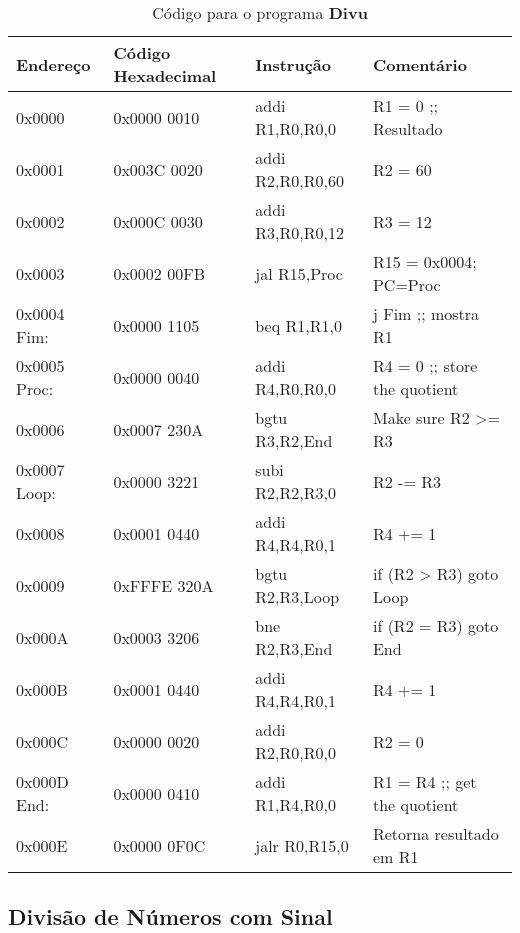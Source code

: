 \documentclass[12pt]{article}
\begin{document}
\begin{table}[H]
    \centering
    \caption{Código para o programa \textbf{Divu}}
    \begin{tabular}{|l|l|l|l|}\hline
        \textbf{Endereço} & \textbf{Código Hexadecimal} & \textbf{Instrução} & \textbf{Comentário} \\\hline
        0x0000       & 0x0000 0010 & addi R1,R0,R0,0  & R1 = 0 ;; Resultado           \\\hline
        0x0001       & 0x003C 0020 & addi R2,R0,R0,60 & R2 = 60                       \\\hline
        0x0002       & 0x000C 0030 & addi R3,R0,R0,12 & R3 = 12                       \\\hline
        0x0003       & 0x0002 00FB & jal R15,Proc     & R15 = 0x0004; PC=Proc         \\\hline
        0x0004 Fim:  & 0x0000 1105 & beq R1,R1,0      & j Fim ;; mostra R1            \\\hline
        0x0005 Proc: & 0x0000 0040 & addi R4,R0,R0,0  & R4 = 0 ;; store the quotient  \\\hline
        0x0006       & 0x0007 230A & bgtu R3,R2,End   & Make sure R2 >= R3            \\\hline
        0x0007 Loop: & 0x0000 3221 & subi R2,R2,R3,0  & R2 -= R3                      \\\hline
        0x0008       & 0x0001 0440 & addi R4,R4,R0,1  & R4 += 1                       \\\hline
        0x0009       & 0xFFFE 320A & bgtu R2,R3,Loop  & if (R2 > R3) goto Loop        \\\hline
        0x000A       & 0x0003 3206 & bne  R2,R3,End   & if (R2 \!= R3) goto End       \\\hline
        0x000B       & 0x0001 0440 & addi R4,R4,R0,1  & R4 += 1                       \\\hline
        0x000C       & 0x0000 0020 & addi R2,R0,R0,0  & R2 = 0                        \\\hline
        0x000D End:  & 0x0000 0410 & addi R1,R4,R0,0  & R1 = R4 ;; get the quotient   \\\hline
        0x000E       & 0x0000 0F0C & jalr R0,R15,0    & Retorna resultado em R1       \\\hline
    \end{tabular}\label{tab:programs:divu}
\end{table}

\subsection{Divisão de Números com Sinal}\label{sec:programs:div}
\end{document}
